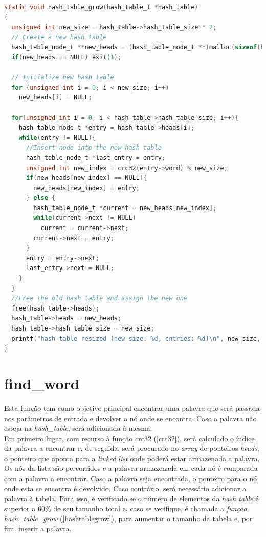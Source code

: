 	\begin{lstlisting}[language=C]
static void hash_table_grow(hash_table_t *hash_table)
{
  unsigned int new_size = hash_table->hash_table_size * 2;
  // Create a new hash table 
  hash_table_node_t **new_heads = (hash_table_node_t **)malloc(sizeof(hash_table_node_t) * new_size);
  if(new_heads == NULL) exit(1);

  // Initialize new hash table
  for (unsigned int i = 0; i < new_size; i++)
    new_heads[i] = NULL;

  for(unsigned int i = 0; i < hash_table->hash_table_size; i++){
    hash_table_node_t *entry = hash_table->heads[i];
    while(entry != NULL){
      //Insert node into the new hash table
      hash_table_node_t *last_entry = entry;
      unsigned int new_index = crc32(entry->word) % new_size;
      if(new_heads[new_index] == NULL){
        new_heads[new_index] = entry;
      } else {
        hash_table_node_t *current = new_heads[new_index];
        while(current->next != NULL)
          current = current->next;
        current->next = entry;
      }
      entry = entry->next;
      last_entry->next = NULL; 
    }
  }
  //Free the old hash table and assign the new one
  free(hash_table->heads);
  hash_table->heads = new_heads;
  hash_table->hash_table_size = new_size;
  printf("hash table resized (new size: %d, entries: %d)\n", new_size, hash_table->number_of_entries);
}
	\end{lstlisting}
	
	\section{find\_word}
	\label{findword}
Esta função tem como objetivo principal encontrar uma palavra que será passada nos parâmetros de entrada e devolver o nó onde se encontra. Caso a palavra não esteja na \textit{hash\_table}, será adicionada à mesma.\\
	Em primeiro lugar, com recurso à função crc32 (\ref{crc32}), será calculado o índice da palavra a encontrar e, de seguida, será procurado no \textit{array} de ponteiros \textit{heads}, o ponteiro que aponta para a \textit{linked list} onde poderá estar armazenada a palavra. Os nós da lista são percorridos e a palavra armazenada em cada nó é comparada com a palavra a encontrar. Caso a palavra seja encontrada, o ponteiro para o nó onde esta se encontra é devolvido. Caso contrário, será necessário adicionar a palavra à tabela. Para isso, é verificado se o número de elementos da \textit{hash table} é superior a 60\% do seu tamanho total e, caso se verifique, é chamada a \textit{função hash\_table\_grow} (\ref{hashtablegrow}), para aumentar o tamanho da tabela e, por fim, inserir a palavra.
	
